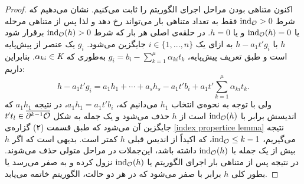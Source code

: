 \begin{proposition}
\begin{proof}
اکنون متناهی بودن مراحل اجرای الگوریتم را ثابت می‌کنیم. نشان می‌دهیم که شرط 
$\operatorname{\mathrm{ind}}_{{\mathcal O}} > 0$
فقط به تعداد متناهی بار می‌تواند رخ دهد و لذا پس از متناهی مرحله یا
$\operatorname{\mathrm{ind}}_{{\mathcal O}}(h) = 0$
و یا 
$h = 0$.
در حلقه‌ی اصلی هر بار که شرط 
$\operatorname{\mathrm{ind}}_{{\mathcal O}}(h) > 0$
برقرار شود 
$h$
با 
$h - a_{1}t'g_{i}$
به ازای یک 
$i\in\{1,...,n\}$
جایگزین می‌شود. 
$g_{i}$
یک عنصر از پیش‌پایه است و طبق تعریف پیش‌پایه،
$g_{i} = b_{i}  - \sum_{k = 1}^{\mu}\alpha_{ki}t_{k}$
به‌طوری که 
$\alpha_{ki}\in\textit{K}$.
بنابراین داریم:
$$h - a_{1}t'g_{i} = a_{1}h_{1} +\cdots + a_{s}h_{s} - a_{1}t'b_{i} + a_{1}t'\sum_{k = 1}^{\mu}\alpha_{ki}t_{k}.$$
ولی با توجه به نحوه‌ی انتخاب 
$h_{1}$
می‌دانیم که، 
$a_{1}h_{1} = a_{1}t'b_{i}$،
در نتیجه 
$a_{1}h_{1}$
که اندیسش برابر با 
$\operatorname{\mathrm{ind}}_{{\mathcal O}}(h)$
است از 
$h$
 حذف می‌شود و یک جمله‌ به شکل 
$t't_{l}\in\overline{\partial^{k-1}\mathcal{O}}$
جایگزین آن می‌شود که طبق قسمت (۲) گزاره‌ی 
\ref{index propertice lemma}
نتیجه می‌گیریم، 
$\operatorname{\mathrm{ind}}_{{\mathcal O}}\leq k-1$،
که اکیداً از اندیس قبلی 
$h$
کمتر است. بدیهی است که اگر 
$h$
بیش از یک جمله با 
$\operatorname{\mathrm{ind}}_{{\mathcal O}}(h)$
داشته باشد، این‌جملات در مراحل متولی حذف می‌شوند. در نتیجه پس از متناهی بار اجرای الگوریتم یا
$\operatorname{\mathrm{ind}}_{{\mathcal O}}(h)$
نزول کرده و به صفر می‌رسد  یا بطور کلی 
$h$
برابر با صفر می‌شود که در هر دو حالت، الگوریتم خاتمه می‌یابد.


\end{proof}
\end{proposition}
